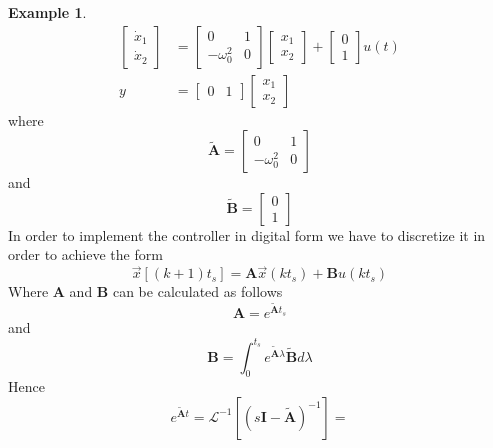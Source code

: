 \documentclass[11pt,a4paper,oneside]{book}
\numberwithin{equation}{section}
\theoremstyle{it}
\theoremstyle{definition}
\newtheorem{example}{Example}[chapter]
\begin{document}
\begin{example}
\begin{equation}
		\begin{aligned}
			\left[ \begin{matrix}
				\dot{x}_1 \\[6pt]
				\dot{x}_2
			\end{matrix}\right] &= 
			\left[ \begin{matrix}
				0 & 1 \\[6pt]
				-\omega_0^2 & 0
			\end{matrix}\right] 
			\left[ \begin{matrix}
				{x}_1 \\[6pt]
				{x}_2
			\end{matrix}\right]+
			\left[ \begin{matrix}
				0 \\[6pt]
				1
			\end{matrix}\right] u(t) \\[6pt]
			y &= 
			\left[ \begin{matrix}
				0 & 1
			\end{matrix}\right] 
			\left[ \begin{matrix}
				{x}_1 \\[6pt]
				{x}_2
			\end{matrix}\right]
		\end{aligned}
	\end{equation}
	where
	\begin{equation}
		\tilde{\mathbf{A}} = 
		\left[ \begin{matrix}
			0 & 1 \\[6pt]
			-\omega_0^2 & 0
		\end{matrix}\right]
	\end{equation}
	and 
	\begin{equation}
		\tilde{\mathbf{B}} = 
		\left[ \begin{matrix}
			0 \\[6pt]
			1
		\end{matrix}\right]
	\end{equation}
	In order to implement the controller in digital form we have to discretize it in order to achieve the form
	\begin{equation}
		\vec{x}\left[(k+1)t_s\right] = \mathbf{A}\vec{x}(kt_s)+\mathbf{B}u(kt_s) 
	\end{equation}
	Where $\mathbf{A}$ and $\mathbf{B}$ can be calculated as follows
	\begin{equation*}
		{\mathbf{A}} = e^{\tilde{\mathbf{A}}t_s}
	\end{equation*}
	and 
	\begin{equation}
		{\mathbf{B}} =  \int_{0}^{t_s}e^{\tilde{\mathbf{A}}\lambda}\tilde{\mathbf{B}}d\lambda
	\end{equation}
	Hence
	\begin{equation}
		e^{\tilde{\mathbf{A}}t} = \mathcal{L}^{-1}\left[ \left(s\mathbf{I}-\tilde{\mathbf{A}} \right)^{-1} \right] =
	\end{equation}
	

\end{example}
\end{document}
